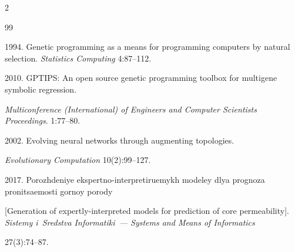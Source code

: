 \vspace*{6pt}



  \begin{multicols}{2}



\renewcommand{\bibname}{\protect\rmfamily References}




{\small\frenchspacing

 {%


 \begin{thebibliography}{99} 





 1994. Genetic programming as a means for programming computers by natural selection. \textit{Statistics Computing} 4:87--112.





 2010. GPTIPS: An open source genetic programming toolbox for multigene symbolic regression. 

 \textit{Multiconference (International) of Engineers and Computer Scientists Proceedings}. 1:77--80. 




 2002. Evolving neural networks through augmenting topologies. 

\textit{Evolutionary Computation} 10(2):99--127.





 2017. Po\-rozh\-de\-niye eks\-pert\-no-inter\-pre\-ti\-ru\-emykh mo\-de\-ley dlya prog\-no\-za pro\-ni\-tsa\-emosti gor\-noy po\-ro\-dy 

 [Generation of expertly-interpreted models for prediction of core permeability]. \textit{Sistemy i~Sredstva Informatiki~--- Systems and Means of Informatics}

  27(3):74--87.




\end{thebibliography}}}
\end{multicols}
